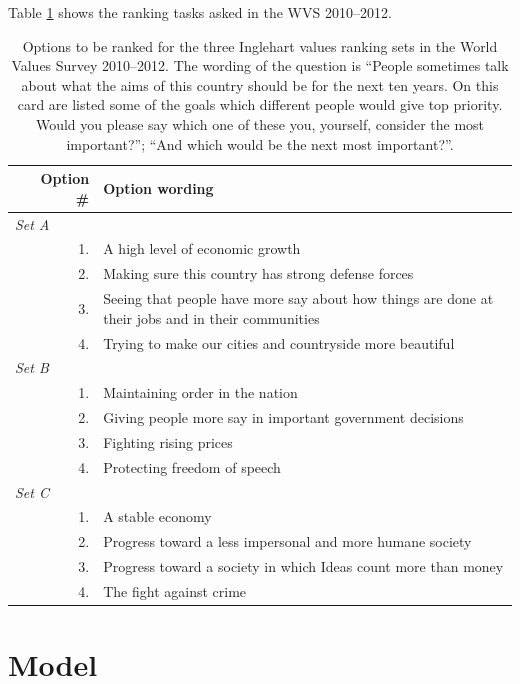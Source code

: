 \documentclass[letterpaper,12pt]{article}
\begin{document}
Table \ref{tab:ranking-question} shows the ranking tasks asked in the WVS 2010--2012.

\begin{table}
\begin{tabular}{p{}rp{}}
\hline
& Option \# & Option wording\\
\hline
\multicolumn{3}{l}{\emph{Set A}}\\
&1. & A high level of economic growth\\
&2. & Making sure this country has strong defense forces \\
&3. & Seeing that people have more say about how things are done at their jobs and in their communities\\
&4. & Trying to make our cities and countryside more beautiful\\

\multicolumn{3}{l}{\emph{Set B}}\\
&1. & 	Maintaining order in the nation\\
&2. & Giving people more say in important government decisions \\
&3. & 	Fighting rising prices\\
&4. & Protecting freedom of speech\\

\multicolumn{3}{l}{\emph{Set C}}\\
&1. & 	A stable economy\\
&2. & Progress toward a less impersonal and more humane society \\
&3. & 	Progress toward a society in which Ideas count more than money \\
&4. & 	The fight against crime\\
\hline
	\end{tabular}
\caption{\label{tab:ranking-question}
Options to be ranked for the three Inglehart values ranking sets in 
the World Values Survey 2010--2012. The wording of the question is
``People sometimes talk about what the aims of this country should be for the next ten years. On this card are listed some of the goals which different people would give top priority. Would you please say which one of these you, yourself, consider the most important?''; ``And which would be the next most important?''.
}
\end{table}

\clearpage
\section{Model}
\end{document}
